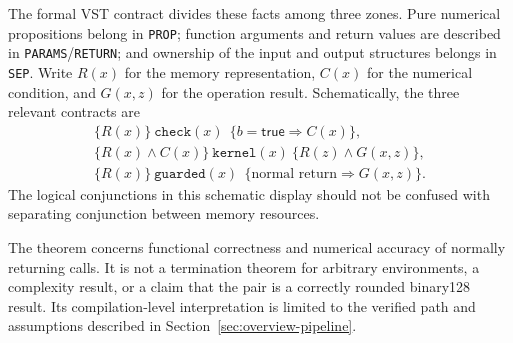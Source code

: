 The formal VST contract divides these facts among three zones.  Pure numerical
propositions belong in \texttt{PROP}; function arguments and return values are
described in \texttt{PARAMS}/\texttt{RETURN}; and ownership of the input and
output structures belongs in \texttt{SEP}.  Write $R(x)$ for the memory
representation, $C(x)$ for the numerical condition, and $G(x,z)$ for the
operation result.  Schematically, the three relevant contracts are
\[
\begin{array}{c}
\{R(x)\}\ \texttt{check}(x)\
  \ \{b=\mathsf{true}\Rightarrow C(x)\},\\[2pt]
\{R(x)\land C(x)\}\ \texttt{kernel}(x)\ \{R(z)\land G(x,z)\},\\[2pt]
\{R(x)\}\ \texttt{guarded}(x)\
  \ \{\text{normal return}\Rightarrow G(x,z)\}.
\end{array}
\]
The logical conjunctions in this schematic display should not be confused with
separating conjunction between memory resources.

The theorem concerns functional correctness and numerical accuracy of normally
returning calls.  It is not a termination theorem for arbitrary environments,
a complexity result, or a claim that the pair is a correctly rounded binary128
result.  Its compilation-level interpretation is limited to the verified path
and assumptions described in Section~\ref{sec:overview-pipeline}.

